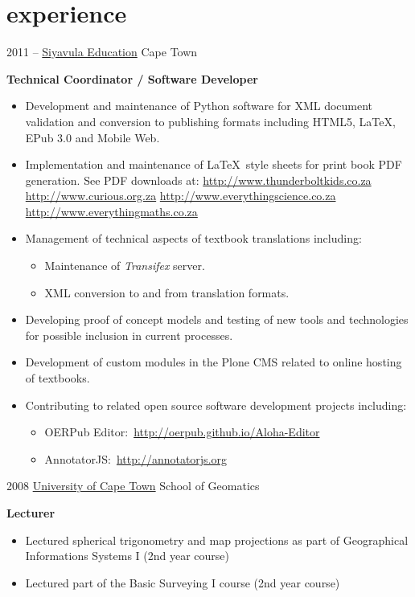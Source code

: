 \documentclass[]{friggeri-cv} %
\begin{document}
\section{experience}
\begin{entrylist}
\entry
{2011 -- }
{\href{http://www.siyavula.com}{Siyavula Education}}
{Cape Town}
{%
\textbf{Technical Coordinator / Software Developer}
\begin{itemize}
\setlength{\itemsep}{5pt}
\item Development and maintenance of Python software for XML document validation and conversion to publishing formats including HTML5, \LaTeX, EPub 3.0 and Mobile Web.
\item Implementation and maintenance of \LaTeX~style sheets for print book PDF generation. See PDF downloads at:
    \subitem \url{http://www.thunderboltkids.co.za}
    \subitem \url{http://www.curious.org.za}
    \subitem \url{http://www.everythingscience.co.za}
    \subitem \url{http://www.everythingmaths.co.za}

\item Management of technical aspects of textbook translations including:
\begin{itemize}
    \renewcommand{\labelitemii}{$\cdot$}
    \item Maintenance of \emph{Transifex} server.
    \item XML conversion to and from translation formats.
\end{itemize}

\item Developing proof of concept models and testing of new tools and technologies for possible inclusion in current processes.

\item Development of custom modules in the Plone CMS related to online hosting of textbooks.

\item Contributing to related open source software development projects including:
\begin{itemize}
    \renewcommand{\labelitemii}{$\cdot$}
    \item OERPub Editor:~\url{http://oerpub.github.io/Aloha-Editor}
    \item AnnotatorJS:~\url{http://annotatorjs.org}
\end{itemize}
\end{itemize}
}
\end{entrylist}
\begin{entrylist}
%
\entry
{2008}
{\href{http://www.uct.ac.za}{University of Cape Town}}
{School of Geomatics}
{%
\textbf{Lecturer}
\begin{itemize}
\setlength{\itemsep}{5pt}
    \item Lectured spherical trigonometry and map projections as part of Geographical Informations Systems I (2nd year course)
    \item Lectured part of the Basic Surveying I course (2nd year course)
\end{itemize}
}
\end{entrylist}
\end{document}
